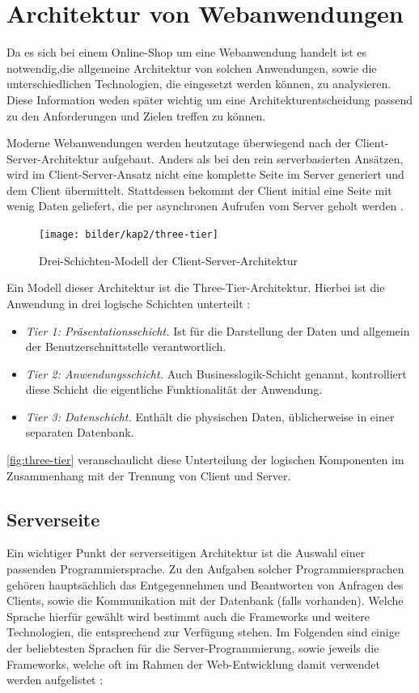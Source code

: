 \section{Architektur von Webanwendungen}\label{web_architecture} \thispagestyle{nomarkstyle}
Da es sich bei einem Online-Shop um eine Webanwendung handelt ist es notwendig,die allgemeine Architektur von solchen Anwendungen, sowie die unterschiedlichen Technologien, die eingesetzt werden können, zu analysieren.
Diese Information weden später wichtig um eine Architekturentscheidung passend zu den Anforderungen und Zielen treffen zu können.

Moderne Webanwendungen werden heutzutage überwiegend nach der Client-Server-Architektur aufgebaut. Anders als bei den rein serverbasierten Ansätzen, wird im Client-Server-Ansatz nicht eine komplette Seite im Server generiert und dem Client übermittelt.
Stattdessen bekommt der Client initial eine Seite mit wenig Daten geliefert, die per asynchronen Aufrufen vom Server geholt werden \cite{Saternos2014}.

\begin{figure}[ht!]
	\centering
	\texttt{[image: bilder/kap2/three-tier]}
	\caption[Drei-Schichten-Modell der Client-Server-Architektur]{Drei-Schichten-Modell der Client-Server-Architektur \cite{Conallen2000}}
	\label{fig:three-tier}
\end{figure}

Ein Modell dieser Architektur ist die Three-Tier-Architektur. Hierbei ist die Anwendung in drei logische Schichten unterteilt \cite{Techopedia2017}:

\begin{itemize}
	\item \textit{Tier 1: Präsentationsschicht.} Ist für die Darstellung der Daten und allgemein der Benutzerschnittstelle verantwortlich.
	\item \textit{Tier 2: Anwendungsschicht.} Auch Businesslogik-Schicht genannt, kontrolliert diese Schicht die eigentliche Funktionalität der Anwendung.
	\item \textit{Tier 3: Datenschicht.} Enthält die physischen Daten, üblicherweise in einer separaten Datenbank.
\end{itemize}

\autoref{fig:three-tier} veranschaulicht diese Unterteilung der logischen Komponenten im Zusammenhang mit der Trennung von Client und Server.

\subsection{Serverseite}
Ein wichtiger Punkt der serverseitigen Architektur ist die Auswahl einer passenden Programmiersprache. Zu den Aufgaben solcher Programmiersprachen gehören hauptsächlich das Entgegennehmen und Beantworten von Anfragen des Clients, sowie die Kommunikation mit der Datenbank (falls vorhanden).
Welche Sprache hierfür gewählt wird bestimmt auch die Frameworks und weitere Technologien, die entsprechend zur Verfügung stehen. Im Folgenden sind einige der beliebtesten Sprachen für die Server-Programmierung, sowie jeweils die Frameworks, welche oft im Rahmen der Web-Entwicklung damit verwendet werden aufgelistet \cite{School2016}:

